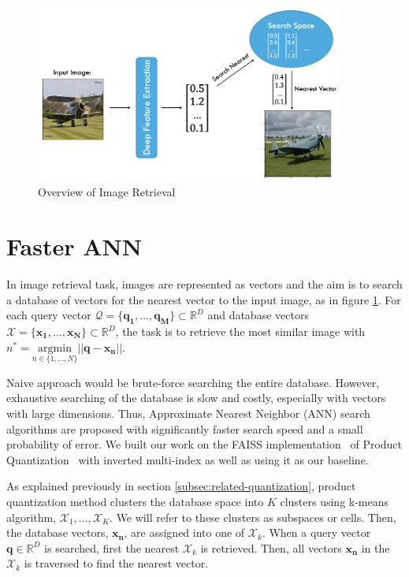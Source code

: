 \begin{figure}
    \centering
    \includegraphics[width=0.9\textwidth]{thesis/images/image_ret_exp-fig.png}
    \caption{Overview of Image Retrieval}
    \label{fig:ret-exp}
\end{figure}


\section{Faster ANN}
\label{sec:FasterANN}

In image retrieval task, images are represented as vectors and the aim is to search a database of vectors for the nearest vector to the input image, as in figure \ref{fig:ret-exp}. 
For each query vector $\mathcal{Q} = \{\bm{q_1},...,\bm{q_M}\} \subset \mathbb{R}^D$ and database vectors $\mathcal{X} = \{\bm{x_1}, ..., \bm{x_N}\} \subset \mathbb{R}^D$, the task is to retrieve the most similar image with $n^* = \underset{n\in\{{1,...,N}\}}{\mathrm{argmin}} \vert\vert \bm{q} - \bm{x_n} \vert\vert $. 

Naive approach would be brute-force searching the entire database.
However, exhaustive searching of the database is slow and costly, especially with vectors with large dimensions. 
Thus, Approximate Nearest Neighbor (ANN) search algorithms are proposed with significantly faster search speed and a small probability of error. 
We built our work on the FAISS implementation~\cite{faiss} of Product Quantization~\cite{jegou2010product} with inverted multi-index as well as using it as our baseline.

As explained previously in section \ref{subsec:related-quantization}, product quantization method clusters the database space into $K$ clusters using k-means algorithm, $\mathcal{X}_1,...,\mathcal{X}_K$. 
We will refer to these clusters as subspaces or cells.
Then, the database vectors, $\bm{x_n}$, are assigned into one of $\mathcal{X}_k$.
When a query vector $\bm{q}\in\mathbb{R}^D$ is searched, first the nearest $\mathcal{X}_k$ is retrieved. 
Then, all vectors $\bm{x_n}$ in the $\mathcal{X}_k$ is traversed to find the nearest vector.

